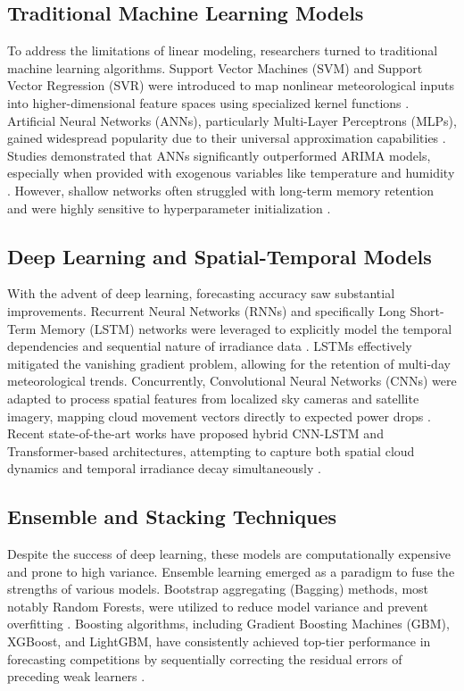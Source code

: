 \documentclass[conference]{IEEEtran}
\begin{document}
\subsection{Traditional Machine Learning Models}
To address the limitations of linear modeling, researchers turned to traditional machine learning algorithms. Support Vector Machines (SVM) and Support Vector Regression (SVR) were introduced to map nonlinear meteorological inputs into higher-dimensional feature spaces using specialized kernel functions \cite{ref6,ref7}. Artificial Neural Networks (ANNs), particularly Multi-Layer Perceptrons (MLPs), gained widespread popularity due to their universal approximation capabilities \cite{ref8,ref9,ref10}. Studies demonstrated that ANNs significantly outperformed ARIMA models, especially when provided with exogenous variables like temperature and humidity \cite{ref11}. However, shallow networks often struggled with long-term memory retention and were highly sensitive to hyperparameter initialization \cite{ref12}.

\subsection{Deep Learning and Spatial-Temporal Models}
With the advent of deep learning, forecasting accuracy saw substantial improvements. Recurrent Neural Networks (RNNs) and specifically Long Short-Term Memory (LSTM) networks were leveraged to explicitly model the temporal dependencies and sequential nature of irradiance data \cite{ref13,ref14,ref15}. LSTMs effectively mitigated the vanishing gradient problem, allowing for the retention of multi-day meteorological trends. Concurrently, Convolutional Neural Networks (CNNs) were adapted to process spatial features from localized sky cameras and satellite imagery, mapping cloud movement vectors directly to expected power drops \cite{ref16,ref17}. Recent state-of-the-art works have proposed hybrid CNN-LSTM and Transformer-based architectures, attempting to capture both spatial cloud dynamics and temporal irradiance decay simultaneously \cite{ref18,ref19,ref20}.

\subsection{Ensemble and Stacking Techniques}
Despite the success of deep learning, these models are computationally expensive and prone to high variance. Ensemble learning emerged as a paradigm to fuse the strengths of various models. Bootstrap aggregating (Bagging) methods, most notably Random Forests, were utilized to reduce model variance and prevent overfitting \cite{ref21,ref22,ref23}. Boosting algorithms, including Gradient Boosting Machines (GBM), XGBoost, and LightGBM, have consistently achieved top-tier performance in forecasting competitions by sequentially correcting the residual errors of preceding weak learners \cite{ref24,ref25,ref26}.
\end{document}
